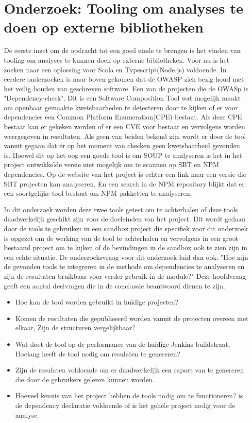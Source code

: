 
\chapter{Onderzoek: Tooling om analyses te doen op externe bibliotheken}


De eerste inzet om de opdracht tot een goed einde te brengen is het vinden van tooling om analyses te kunnen doen op externe bibliotheken. Voor nu is het zoeken naar een oplossing voor Scala en Typescript(Node.js) voldoende. In eerdere onderzoeken is naar boven gekomen dat de OWASP zich bezig houd met het veilig houden van geschreven software. Een van de projecten die de OWASp is "Dependency-check". Dit is een Software Composition Tool wat mogelijk maakt om openbaar gemaakte kwetsbaarheden te detecteren door te kijken of er voor dependencies een Common Platform Enumeration(CPE) bestaat. Als deze CPE bestaat kan er gekeken worden of er een CVE voor bestaat en vervolgens worden weergegeven in resultaten. Als geen van beiden bekend zijn wordt er door de tool vanuit gegaan dat er op het moment van checken geen kwetsbaarheid gevonden is. Hoewel dit op het oog een goede tool is om SOUP te analyseren is het in het project ontwikkelde versie niet mogelijk om te scannen op SBT en NPM dependencies. Op de website van het project is echter een link naar een versie die SBT projecten kan analyseren. En een search in de NPM repository blijkt dat er een soortgelijke tool bestaat om NPM pakketten te analyseren.


In dit onderzoek worden deze twee tools getest om te achterhalen of deze tools daadwerkelijk geschikt zijn voor de doeleinden van het project. Dit wordt gedaan door de tools te gebruiken in een sandbox project die specifiek voor dit onderzoek is opgezet om de werking van de tool te achterhalen en vervolgens in een groot bestaand project om te kijken of de bevindingen in de sandbox ook te zien zijn in een echte situatie.
De onderzoeksvraag voor dit onderzoek luid dan ook: "Hoe zijn de gevonden tools te integreren in de methode om dependencies te analyseren en zijn de resultaten bruikbaar voor verder gebruik in de module?" Deze hoofdvraag geeft een aantal deelvragen die in de conclussie beantwoord dienen te zijn.
\begin{itemize}
    \item Hoe kan de tool worden gebruikt in huidige projecten?
    \item Komen de resultaten die gepubliseerd worden vanuit de projecten overeen met elkaar, Zijn de structuren vergelijkbaar?
    \item Wat doet de tool op de performance van de huidige Jenkins buildstraat, Hoelang heeft de tool nodig om resulaten te genereren?
    \item Zijn de resulaten voldoende om er daadwerkelijk een raport van te genereren die door de gebruikers gelezen kunnen worden.
    \item Hoeveel kennis van het project hebben de tools nodig om te functioneren? is de dependency declaratie voldoende of is het gehele project nodig voor de analyse.
\end{itemize}


